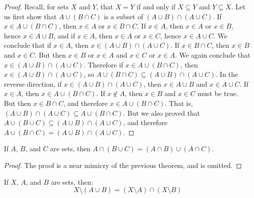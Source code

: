             \begin{proof}
                Recall, for sets $X$ and $Y$, that $X=Y$ if and only if
                $X\subseteq{Y}$ and $Y\subseteq{X}$. Let us first show that
                $A\cup(B\cap{C})$ is a subset of
                $(A\cup{B})\cap(A\cup{C})$. If $x\in{A}\cup(B\cap{C})$, then
                $x\in{A}$ or $x\in{B}\cap{C}$. If $x\in{A}$, then
                $x\in{A}$ or $x\in{B}$, hence $x\in{A}\cup{B}$, and if
                $x\in{A}$, then $x\in{A}$ or $x\in{C}$, hence
                $x\in{A}\cup{C}$. We conclude that if $x\in{A}$, then
                $x\in(A\cup{B})\cap(A\cup{C})$. If $x\in{B}\cap{C}$, then
                $x\in{B}$ and $x\in{C}$. But then
                $x\in{B}$ or $x\in{A}$ and $x\in{C}$ or $x\in{A}$. We again
                conclude that $x\in(A\cup{B})\cap(A\cup{C})$. Therefore if
                $x\in{A}\cup(B\cap{C})$, then
                $x\in(A\cup{B})\cap(A\cup{C})$, so
                $A\cup(B\cap{C})\subseteq(A\cup{B})\cap(A\cup{C})$. In the
                reverse direction, if $x\in(A\cup{B})\cap(A\cup{C})$, then
                $x\in{A}\cup{B}$ and $x\in{A}\cup{C}$. If $x\in{A}$,
                then $x\in{A}\cup(B\cap{C})$. If $x\notin{A}$, then
                $x\in{B}$ and $x\in{C}$ must be true. But then
                $x\in{B}\cap{C}$, and therefore $x\in{A}\cup(B\cap{C})$.
                That is, $(A\cup{B})\cap(A\cup{C})\subseteq{A}\cup(B\cap{C})$.
                But we also proved that
                $A\cup(B\cup{C})\subseteq(A\cup{B})\cap(A\cup{C})$,
                and therefore $A\cup(B\cap{C})=(A\cup{B})\cap(A\cup{C})$.
            \end{proof}
            \begin{theorem}
                If $A$, $B$, and $C$ are sets, then
                $A\cap(B\cup{C})=(A\cap{B})\cup(A\cap{C})$.%
            \end{theorem}
            \begin{proof}
                The proof is a near mimicry of the previous theorem, and is
                omitted.
            \end{proof}
            \begin{theorem}
                If $X$, $A$, and $B$ are sets, then:%
                \begin{equation}
                    X\setminus(A\cup{B})=
                    (X\setminus{A})\cap(X\setminus{B})
                \end{equation}
            \end{theorem}
